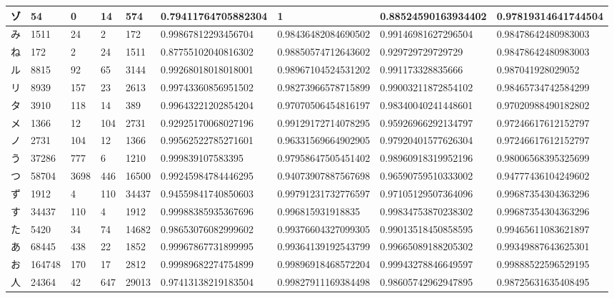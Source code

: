 \begin{table}[H]
\begin{center}
\begin{CJK}{UTF8}{min}
\begin{tabular}{ | l | l | l | l | l | l | l | l | l | }
			ゾ & 54 & 0 & 14 & 574 & 0.79411764705882304 & 1 & 0.88524590163934402 & 0.97819314641744504 \\ \hline
			み & 1511 & 24 & 2 & 172 & 0.99867812293456704 & 0.98436482084690502 & 0.99146981627296504 & 0.98478642480983003 \\ \hline
			ね & 172 & 2 & 24 & 1511 & 0.87755102040816302 & 0.98850574712643602 & 0.929729729729729 & 0.98478642480983003 \\ \hline
			ル & 8815 & 92 & 65 & 3144 & 0.99268018018018001 & 0.98967104524531202 & 0.991173328835666 & 0.987041928029052 \\ \hline
			リ & 8939 & 157 & 23 & 2613 & 0.99743360856951502 & 0.98273966578715899 & 0.99003211872854102 & 0.98465734742584299 \\ \hline
			タ & 3910 & 118 & 14 & 389 & 0.99643221202854204 & 0.97070506454816197 & 0.98340040241448601 & 0.97020988490182802 \\ \hline
			メ & 1366 & 12 & 104 & 2731 & 0.92925170068027196 & 0.99129172714078295 & 0.95926966292134797 & 0.97246617612152797 \\ \hline
			ノ & 2731 & 104 & 12 & 1366 & 0.99562522785271601 & 0.96331569664902905 & 0.97920401577626304 & 0.97246617612152797 \\ \hline
			う & 37286 & 777 & 6 & 1210 & 0.999839107583395 & 0.97958647505451402 & 0.98960918319952196 & 0.98006568395325699 \\ \hline
			つ & 58704 & 3698 & 446 & 16500 & 0.99245984784446295 & 0.94073907887567698 & 0.96590759510333002 & 0.94777436104249602 \\ \hline
			ず & 1912 & 4 & 110 & 34437 & 0.94559841740850603 & 0.99791231732776597 & 0.97105129507364096 & 0.99687354304363296 \\ \hline
			す & 34437 & 110 & 4 & 1912 & 0.99988385935367696 & 0.996815931918835 & 0.99834753870238302 & 0.99687354304363296 \\ \hline
			た & 5420 & 34 & 74 & 14682 & 0.98653076082999602 & 0.99376604327099305 & 0.99013518450858595 & 0.99465611083621897 \\ \hline
			あ & 68445 & 438 & 22 & 1852 & 0.99967867731899995 & 0.99364139192543799 & 0.99665089188205302 & 0.99349887643625301 \\ \hline
			お & 164748 & 170 & 17 & 2812 & 0.99989682274754899 & 0.99896918468572204 & 0.99943278846649597 & 0.99888522596529195 \\ \hline
			人 & 24364 & 42 & 647 & 29013 & 0.97413138219183504 & 0.99827911169384498 & 0.98605742962947895 & 0.98725631635408495 \\ \hline

\end{tabular}
\end{CJK}
\end{center}
\end{table}
